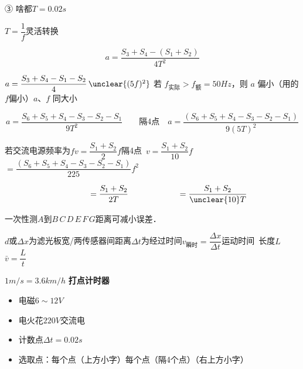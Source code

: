 ③ 啥都\quad $T=0.02\unit{s}$

$T=\dfrac{1}{f}$\quad 灵活转换


\[
a=\frac{S_3+S_4-(S_1+S_2)}{4T^2}
\]

$a=\dfrac{S_3+S_4-S_1-S_2}{4}\,\unclear{(5f)^2}$ %
\quad 若 $f_{\text{实际}}>f_{\text{额}}=50\unit{Hz}$，则 $a$ 偏小\quad （用的$f$偏小）\quad $a$、$f$ 同大小 %

\[
a=\frac{S_6+S_5+S_4-S_3-S_2-S_1}{9T^2}\qquad\text{隔4点}\quad a=\frac{(S_6+S_5+S_4-S_3-S_2-S_1)}{9(5T)^2}
\]

若交流电源频率为$f$\quad $v=\dfrac{S_1+S_2}{2}f$\quad 隔4点\ $v=\dfrac{S_1+S_2}{10}f$\quad $=\dfrac{(S_6+S_5+S_4-S_3-S_2-S_1)}{225}f^2$

\[
\hspace{4em}=\frac{S_1+S_2}{2T}\hspace{6em}=\frac{S_1+S_2}{\text{\unclear{10}}T} %
\]

\begin{center}
一次性测$A$到$B\,C\,D\,E\,F\,G$距离可减小误差．
\end{center}
$d$或$\Delta x$为滤光板宽/两传感器间距离\quad $\Delta t$为经过时间\quad $v_{\text{瞬时}}=\dfrac{\Delta x}{\Delta t}$\quad 运动时间\ 长度$L$\quad $\bar v=\dfrac{L}{t}$ %

$1\unit{m/s}=3.6\unit{km/h}$
\textbf{打点计时器}
\begin{itemize}
\item 电磁\quad $6\sim12\unit{V}$ %
\item 电火花\quad $220\unit{V}$\quad {}\quad 交流电 %
\end{itemize}


\begin{itemize}
\item 计数点\quad $\Delta t=0.02\unit{s}$ %
\item 选取点：每个点（上方小字）\quad 每个点（隔4个点）（右上方小字） %
\end{itemize}

